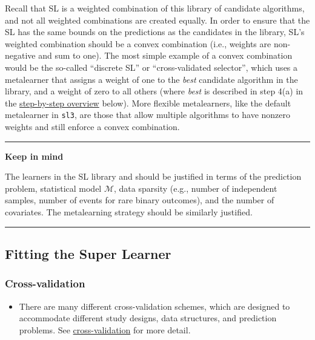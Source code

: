 \documentclass[
  12pt, krantz2,
]{krantz}
\newcommand{\passthrough}[1]{#1}
\providecommand{\tightlist}{%
  \setlength{\itemsep}{0pt}\setlength{\parskip}{0pt}}
\newcommand{\M}{\mathcal{M}}
\newcommand{\1}{\mathbbm{1}}
\theoremstyle{definition}
\theoremstyle{definition}
\theoremstyle{definition}
\theoremstyle{definition}
\theoremstyle{remark}
\begin{document}
Recall that SL is a weighted combination of this library of candidate
algorithms, and not all weighted combinations are created equally. In order to
ensure that the SL has the same bounds on the predictions as the candidates in
the library, SL's weighted combination should be a convex combination
(i.e., weights are non-negative and sum to one). The most simple example of a
convex combination would be the so-called ``discrete SL'' or
``cross-validated selector'', which uses a metalearner that assigns a weight of
one to the \emph{best} candidate algorithm in the library, and a weight of zero to
all others (where \emph{best} is described in step 4(a) in the \protect\hyperlink{sl3-theory}{step-by-step
overview} below). More flexible metalearners,
like the default metalearner in \passthrough{\lstinline!sl3!}, are those that allow multiple algorithms
to have nonzero weights and still enforce a convex combination.

\begin{center}\rule{0.5\linewidth}{0.5pt}\end{center}

\textbf{Keep in mind}

The learners in the SL library and should be justified in terms of the prediction
problem, statistical model \(\M\), data sparsity (e.g., number of
independent samples, number of events for rare binary outcomes), and the number
of covariates. The metalearning strategy should be similarly justified.

\begin{center}\rule{0.5\linewidth}{0.5pt}\end{center}

\hypertarget{sl3-steps}{%
\subsection{Fitting the Super Learner}\label{sl3-steps}}

\hypertarget{cross-validation}{%
\subsubsection{Cross-validation}\label{cross-validation}}

\begin{itemize}
\tightlist
\item
  There are many different cross-validation schemes, which are designed to
  accommodate different study designs, data structures, and prediction
  problems. See \protect\hyperlink{causal}{cross-validation} for more detail.
\end{itemize}
\end{document}
